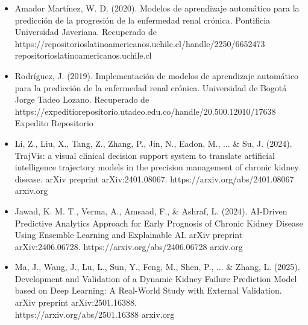 \documentclass{article}
\begin{document}
\begin{itemize}
    \item Amador Martínez, W. D. (2020). Modelos de aprendizaje automático para la predicción de la progresión de la enfermedad renal crónica. Pontificia Universidad Javeriana. Recuperado de https://repositorioslatinoamericanos.uchile.cl/handle/2250/6652473 repositorioslatinoamericanos.uchile.cl
    \item Rodríguez, J. (2019). Implementación de modelos de aprendizaje automático para la predicción de la enfermedad renal crónica. Universidad de Bogotá Jorge Tadeo Lozano. Recuperado de https://expeditiorepositorio.utadeo.edu.co/handle/20.500.12010/17638 Expedito Repositorio
    \item Li, Z., Liu, X., Tang, Z., Zhang, P., Jin, N., Eadon, M., ... \& Su, J. (2024). TrajVis: a visual clinical decision support system to translate artificial intelligence trajectory models in the precision management of chronic kidney disease. arXiv preprint arXiv:2401.08067. https://arxiv.org/abs/2401.08067 arxiv.org
    \item Jawad, K. M. T., Verma, A., Amsaad, F., \& Ashraf, L. (2024). AI-Driven Predictive Analytics Approach for Early Prognosis of Chronic Kidney Disease Using Ensemble Learning and Explainable AI. arXiv preprint arXiv:2406.06728. https://arxiv.org/abs/2406.06728 arxiv.org
    \item Ma, J., Wang, J., Lu, L., Sun, Y., Feng, M., Shen, P., ... \& Zhang, L. (2025). Development and Validation of a Dynamic Kidney Failure Prediction Model based on Deep Learning: A Real-World Study with External Validation. arXiv preprint arXiv:2501.16388.
        \\https://arxiv.org/abs/2501.16388 arxiv.org
\end{itemize}
\newpage
\end{document}
